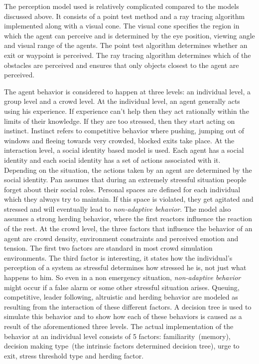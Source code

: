 The perception model used is relatively complicated compared to the models discussed above. It consists of a point test method and a ray tracing algorithm implemented along with a visual cone. The visual cone specifies the region in which the agent can perceive and is determined by the eye position, viewing angle and visual range of the agents. The point test algorithm determines whether an exit or waypoint is perceived. The ray tracing algorithm determines which of the obstacles are perceived and ensures that only objects closest to the agent are perceived.

The agent behavior is considered to happen at three levels: an individual level, a group level and a crowd level. At the individual level, an agent generally acts using his experience. If experience can't help then they act rationally within the limits of their knowledge. If they are too stressed, then they start acting on instinct. Instinct refers to competitive behavior where pushing, jumping out of windows and fleeing towards very crowded, blocked exits take place. At the interaction level, a social identity based model is used. Each agent has a social identity and each social identity has a set of actions associated with it. Depending on the situation, the actions taken by an agent are determined by the social identity. Pan assumes that during an extremely stressful situation people forget about their social roles. Personal spaces are defined for each individual which they always try to maintain. If this space is violated, they get agitated and stressed and will eventually lead to \emph{non-adaptive behavior}. The model also assumes a strong herding behavior, where the first reactors influence the reaction of the rest. At the crowd level, the three factors that influence the behavior of an agent are crowd density, environment constraints and perceived emotion and tension. The first two factors are standard in most crowd simulation environments. The third factor is interesting, it states how the individual's perception of a system as stressful determines how stressed he is, not just what happens to him. So even in a non emergency situation, \emph{non-adaptive behavior} might occur if a false alarm or some other stressful situation arises. Queuing, competitive, leader following, altruistic and herding behavior are modeled as resulting from the interaction of these different factors. A decision tree is used to simulate this behavior and to show how each of these behaviors is caused as a result of the aforementioned three levels. The actual implementation of the behavior at an individual level consists of 5 factors: familiarity~(memory), decision making type~(the intrinsic factors determined decision tree), urge to exit, stress threshold type and herding factor.

